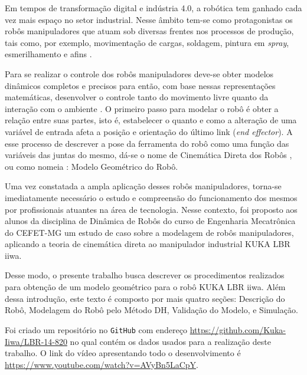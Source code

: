 Em tempos de transformação digital e indústria 4.0, a robótica tem ganhado cada vez mais espaço no setor industrial. Nesse âmbito tem-se como protagonistas os robôs manipuladores que atuam sob diversas frentes nos processos de produção, tais como, por exemplo, movimentação de cargas, soldagem, pintura em \textit{spray}, esmerilhamento e afins \citep[Cap. 1]{spong08}. 

Para se realizar o controle dos robôs manipuladores deve-se obter modelos dinâmicos completos e precisos para então, com base nessas representações matemáticas, desenvolver o controle tanto do movimento livre quanto da interação com o ambiente \citep{GL17}. O primeiro passo para modelar o robô é obter a relação entre suas partes, isto é, estabelecer o quanto e como a alteração de uma variável de entrada afeta a posição e orientação do último link (\textit{end effector}). A esse processo de descrever a pose da ferramenta do robô como uma função das variáveis das juntas do mesmo, dá-se o nome de Cinemática Direta dos Robôs \citep{siciliano2010}, ou como nomeia \cite{mihelj2018}: Modelo Geométrico do Robô. 

Uma vez constatada a ampla aplicação desses robôs manipuladores, torna-se imediatamente necessário o estudo e compreensão do funcionamento dos mesmos por profissionais atuantes na área de tecnologia. Nesse contexto, foi proposto aos alunos da disciplina de Dinâmica de Robôs do curso de Engenharia Mecatrônica do CEFET-MG um estudo de caso sobre a modelagem de robôs manipuladores, aplicando a teoria de cinemática direta ao manipulador industrial KUKA LBR iiwa.

Desse modo, o presente trabalho busca descrever os procedimentos realizados para obtenção de um modelo geométrico para o robô KUKA LBR iiwa. Além dessa introdução, este texto é composto por mais quatro seções: Descrição do Robô, Modelagem do Robô pelo Método DH, Validação do Modelo, e Simulação. 

Foi criado um repositório no \texttt{GitHub} com endereço \url{https://github.com/Kuka-Iiwa/LBR-14-820} no qual contém os dados usados para a realização deste trabalho. O link do vídeo apresentando todo o desenvolvimento é \url{https://www.youtube.com/watch?v=AVyBn5LaCpY}.